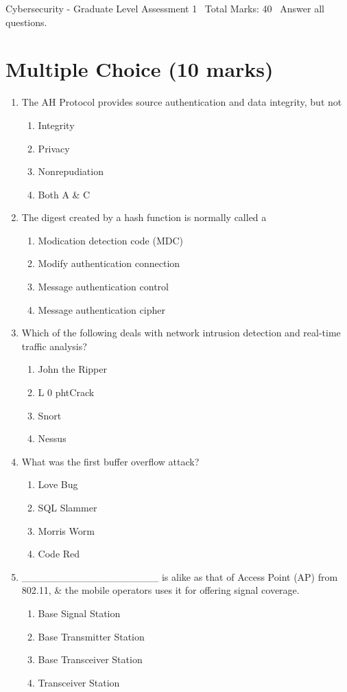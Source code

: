 \documentclass[12pt]{article}
\begin{document}
\begin{center}
Cybersecurity - Graduate Level Assessment 1 \
Total Marks: 40 \
Answer all questions.
\end{center}

\section*{Multiple Choice (10 marks)}
\begin{enumerate}[label=\arabic*.]
\item The AH Protocol provides source authentication and data integrity, but not
\begin{enumerate}[label=(\alph*)]
    \item Integrity
    \item Privacy
    \item Nonrepudiation
    \item Both A \& C
\end{enumerate}
\item The digest created by a hash function is normally called a
\begin{enumerate}[label=(\alph*)]
    \item Modication detection code (MDC)
    \item Modify authentication connection
    \item Message authentication control
    \item Message authentication cipher
\end{enumerate}
\item Which of the following deals with network intrusion detection and real-time traffic analysis?
\begin{enumerate}[label=(\alph*)]
    \item John the Ripper
    \item L 0 phtCrack
    \item Snort
    \item Nessus
\end{enumerate}
\item What was the first buffer overflow attack?
\begin{enumerate}[label=(\alph*)]
    \item Love Bug
    \item SQL Slammer
    \item Morris Worm
    \item Code Red
\end{enumerate}
\item \_\_\_\_\_\_\_\_\_\_\_\_\_\_\_\_\_\_\_ is alike as that of Access Point (AP) from 802.11, \& the mobile operators uses it for offering signal coverage.
\begin{enumerate}[label=(\alph*)]
    \item Base Signal Station
    \item Base Transmitter Station
    \item Base Transceiver Station
    \item Transceiver Station
\end{enumerate}
\end{enumerate}
\end{document}
